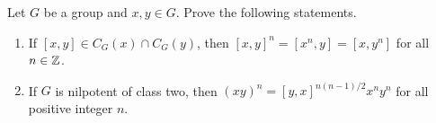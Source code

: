 


\begin{prob}
Let $G$ be a group and $x,y\in G$.  Prove the following statements.
\begin{enumerate}
	\item If $[x,y]\in C_G(x)\cap C_G(y)$, then
	$[x,y]^n=[x^n,y]=[x,y^n]$
	for all $n\in\mathbb{Z}$.
	\item If $G$ is nilpotent of class two, then $(xy)^n=[y,x]^{n(n-1)/2}x^ny^n$ 
	for all positive integer $n$.
\end{enumerate}	
\end{prob}

